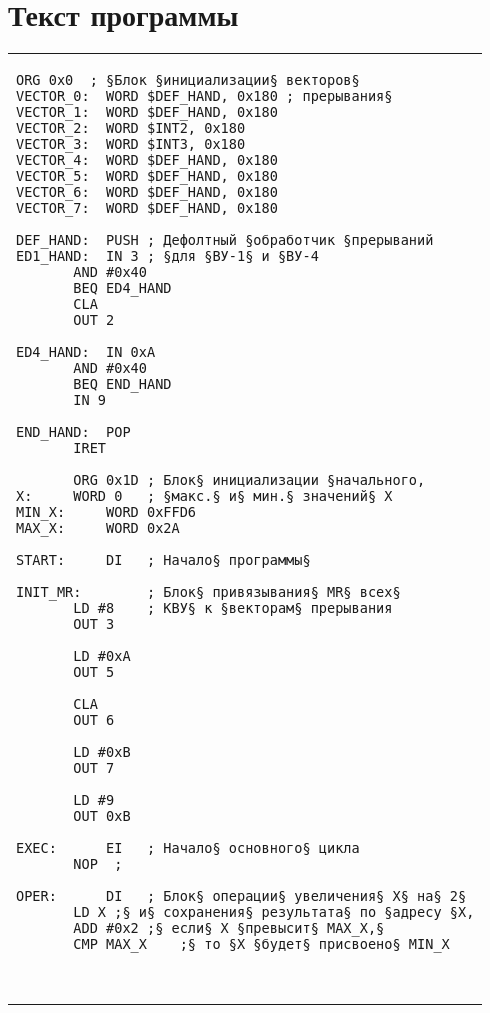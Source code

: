 \section{Текст программы}
\noindent\begin{center}
	\begin{tabular}{l}
		\begin{lstlisting}[basicstyle=\ttfamily]
	   ORG 0x0	; §Блок §инициализации§ векторов§
VECTOR_0:  WORD $DEF_HAND, 0x180 ; прерывания§
VECTOR_1:  WORD $DEF_HAND, 0x180
VECTOR_2:  WORD $INT2, 0x180
VECTOR_3:  WORD $INT3, 0x180
VECTOR_4:  WORD $DEF_HAND, 0x180
VECTOR_5:  WORD $DEF_HAND, 0x180
VECTOR_6:  WORD $DEF_HAND, 0x180
VECTOR_7:  WORD $DEF_HAND, 0x180
	
DEF_HAND:  PUSH	; Дефолтный §обработчик §прерываний 
ED1_HAND:  IN 3	; §для §ВУ-1§ и §ВУ-4
	   AND #0x40
	   BEQ ED4_HAND
   	   CLA
	   OUT 2

ED4_HAND:  IN 0xA
	   AND #0x40
	   BEQ END_HAND
	   IN 9
		
END_HAND:  POP
	   IRET	

	   ORG 0x1D ; Блок§ инициализации §начального,
X:	   WORD 0 	; §макс.§ и§ мин.§ значений§ X
MIN_X:     WORD 0xFFD6
MAX_X:	   WORD 0x2A

START:	   DI	; Начало§ программы§

INIT_MR:   		; Блок§ привязывания§ MR§ всех§ 
	   LD #8	; КВУ§ к §векторам§ прерывания
	   OUT 3

	   LD #0xA
	   OUT 5
		
	   CLA
	   OUT 6
	
   	   LD #0xB 
	   OUT 7
		
	   LD #9
	   OUT 0xB
		
EXEC:	   EI	; Начало§ основного§ цикла
	   NOP	;
	
OPER:	   DI	; Блок§ операции§ увеличения§ X§ на§ 2§ 
	   LD X	;§ и§ сохранения§ результата§ по §адресу §X,
	   ADD #0x2	;§ если§ X §превысит§ MAX_X,§ 
	   CMP MAX_X	;§ то §X §будет§ присвоено§ MIN_X
		
			   
		\end{lstlisting}
	\end{tabular}
\end{center}

